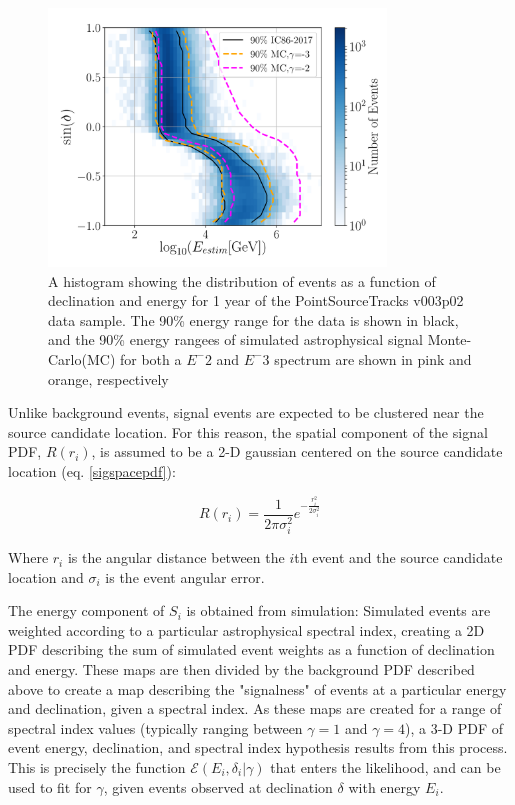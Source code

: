 \begin{figure}[h]
\centering
\includegraphics[width=0.8\textwidth]{figs/DecEnDist.png}
\caption{A histogram showing the distribution of events as a function of declination and energy for 1 year of the PointSourceTracks v003p02 data sample. The  90\%  energy  range  for  the  data is shown in black, and the 90\% energy rangees of simulated astrophysical signal Monte-Carlo(MC) for both a $E^−2$ and $E^−3$ spectrum are shown in pink and orange, respectively\cite{10yrpublicdata}}
\label{fig:DecEnDist}
\end{figure}

Unlike background events, signal events are expected to be clustered near the source candidate location. For this reason, the spatial component of the signal PDF, $R(r_i)$, is assumed to be a 2-D gaussian centered on the source candidate location (eq. \ref{sigspacepdf}):

\begin{equation}
    R(r_i) = \frac{1}{2\pi\sigma_{i}^2} e ^{-\frac{r_i^2}{2\sigma_i^2}}
    \label{sigspacepdf}
\end{equation}

Where $r_i$ is the angular distance between the $i$th event and the source candidate location and $\sigma_i$ is the event angular error.  

The energy component of $S_i$ is obtained from simulation: Simulated events are weighted according to a particular astrophysical spectral index, creating a 2D PDF describing the sum of simulated event weights as a function of declination and energy. These maps are then divided by the background PDF described above to create a map describing the "signalness" of events at a particular energy and declination, given a spectral index. As these maps are created for a range of spectral index values (typically ranging between $\gamma=1$ and $\gamma=4$), a 3-D PDF of event energy, declination, and spectral index hypothesis results from this process. This is precisely the function $\mathcal{E}(E_i, \delta_i|\gamma)$ that enters the likelihood, and can be used to fit for $\gamma$, given events observed at declination $\delta$ with energy $E_i$.  

